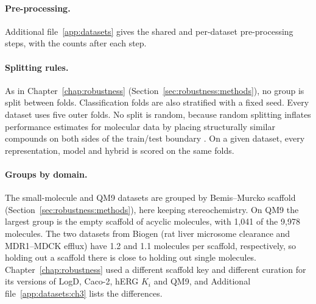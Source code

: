 \paragraph{Pre-processing.} Additional file~\ref{app:datasets} gives the shared and per-dataset pre-processing steps, with the counts after each step.

\paragraph{Splitting rules.} As in Chapter~\ref{chap:robustness} (Section~\ref{sec:robustness:methods}), no group is split between folds. Classification folds are also stratified with a fixed seed. Every dataset uses five outer folds. No split is random, because random splitting inflates performance estimates for molecular data by placing structurally similar compounds on both sides of the train/test boundary \citep{Yang2019, Wallach2018}. On a given dataset, every representation, model and hybrid is scored on the same folds.


\paragraph{Groups by domain.} The small-molecule and QM9 datasets are grouped by Bemis--Murcko scaffold (Section~\ref{sec:robustness:methods}), here keeping stereochemistry. On QM9 the largest group is the empty scaffold of acyclic molecules, with 1,041 of the 9,978 molecules. The two datasets from Biogen \citep{fang2023} (rat liver microsome clearance and MDR1--MDCK efflux) have 1.2 and 1.1 molecules per scaffold, respectively, so holding out a scaffold there is close to holding out single molecules. Chapter~\ref{chap:robustness} used a different scaffold key and different curation for its versions of LogD, Caco-2, hERG $K_i$ and QM9, and Additional file~\ref{app:datasets:ch3} lists the differences.

